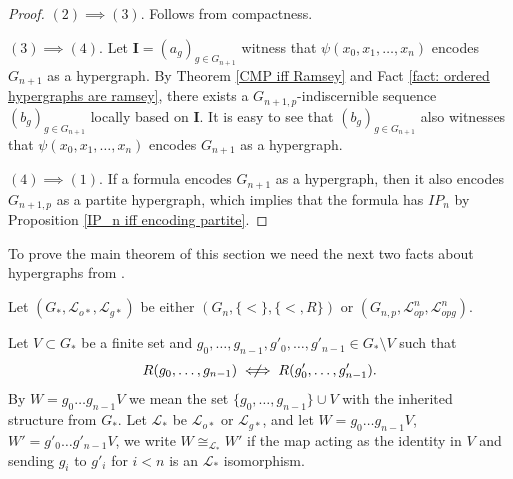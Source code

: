\documentclass{amsart}
\newcommand{\notiff}{%
  \mathrel{{\ooalign{\hidewidth$\not\phantom{"}$\hidewidth\cr$\iff$}}}}
\newtheorem{external claim}[teor]{Claim}
\newcommand{\mL}{\mathcal{L}}
\newcommand{\II}{\mathbf{I}}
\begin{document}
\begin{proof}
            
            $(2)\implies(3)$. Follows from compactness.
            
            $(3)\implies(4)$. Let $\II=(a_g)_{g\in G_{n+1}}$ witness that $\psi(x_0,x_1,\dots,x_n)$ encodes $G_{n+1}$ as a hypergraph. By Theorem \ref{CMP iff Ramsey} and Fact \ref{fact: ordered hypergraphs are ramsey}, there exists a $G_{n+1,p}$-indiscernible sequence $(b_g)_{g\in G_{n+1}}$ locally based on $\II$. It is easy to see that $(b_g)_{g\in G_{n+1}}$ also witnesses that $\psi(x_0,x_1,\dots,x_n)$ encodes $G_{n+1}$ as a hypergraph.
            
            $(4)\implies(1)$. If a formula encodes $G_{n+1}$ as a hypergraph, then it also encodes $G_{n+1,p}$ as a partite hypergraph, which implies that the formula has $IP_n$ by Proposition \ref{IP_n iff encoding partite}.
    \end{proof}

To prove the main theorem of this section we need the next two facts about hypergraphs from \cite{Chernikov2014OnN}.

Let $(G_*,\mL_{o*},\mL_{g*})$ be either $(G_n,\{ <\}, \{<, R\})$ or $(G_{n,p},\mL^n_{op},\mL^n_{opg})$. 

Let $V\subset G_*$ be a finite set and $g_0,\dots,g_{n-1}, g'_0,\dots,g'_{n-1}\in G_*\setminus V$ such that $$R(g_0,\dots,g_{n-1})\notiff R(g'_0,\dots,g'_{n-1}).$$
By $W=g_0\dots g_{n-1}V$ we mean the set $\{ g_0,\dots,g_{n-1} \}\cup V$ with the inherited structure from $G_*$. Let $\mL_*$ be $\mL_{o*}$ or $\mL_{g*}$, and let $W=g_0\dots g_{n-1}V$, $W'=g'_0\dots g'_{n-1}V$, we write $W\cong_{\mL_*}W'$ if the map acting as the identity in $V$ and sending $g_i$ to $g'_i$ for $i<n$ is an $\mL_*$ isomorphism. 
\end{document}
